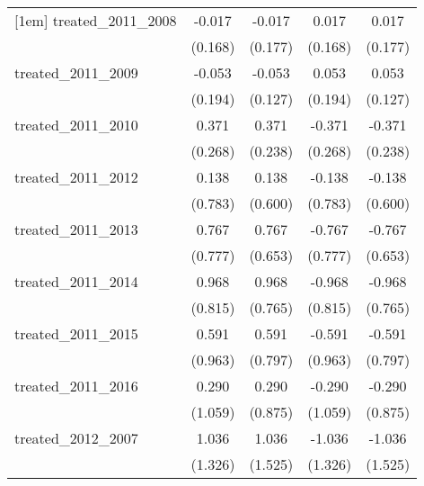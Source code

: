{\begin{tabular}{l*{4}{c}}
[1em]
treated\_2011\_2008&      -0.017         &      -0.017         &       0.017         &       0.017         \\
            &     (0.168)         &     (0.177)         &     (0.168)         &     (0.177)         \\
[1em]
treated\_2011\_2009&      -0.053         &      -0.053         &       0.053         &       0.053         \\
            &     (0.194)         &     (0.127)         &     (0.194)         &     (0.127)         \\
[1em]
treated\_2011\_2010&       0.371         &       0.371         &      -0.371         &      -0.371         \\
            &     (0.268)         &     (0.238)         &     (0.268)         &     (0.238)         \\
[1em]
treated\_2011\_2012&       0.138         &       0.138         &      -0.138         &      -0.138         \\
            &     (0.783)         &     (0.600)         &     (0.783)         &     (0.600)         \\
[1em]
treated\_2011\_2013&       0.767         &       0.767         &      -0.767         &      -0.767         \\
            &     (0.777)         &     (0.653)         &     (0.777)         &     (0.653)         \\
[1em]
treated\_2011\_2014&       0.968         &       0.968         &      -0.968         &      -0.968         \\
            &     (0.815)         &     (0.765)         &     (0.815)         &     (0.765)         \\
[1em]
treated\_2011\_2015&       0.591         &       0.591         &      -0.591         &      -0.591         \\
            &     (0.963)         &     (0.797)         &     (0.963)         &     (0.797)         \\
[1em]
treated\_2011\_2016&       0.290         &       0.290         &      -0.290         &      -0.290         \\
            &     (1.059)         &     (0.875)         &     (1.059)         &     (0.875)         \\
[1em]
treated\_2012\_2007&       1.036         &       1.036         &      -1.036         &      -1.036         \\
            &     (1.326)         &     (1.525)         &     (1.326)         &     (1.525)         \\

\end{tabular}}
